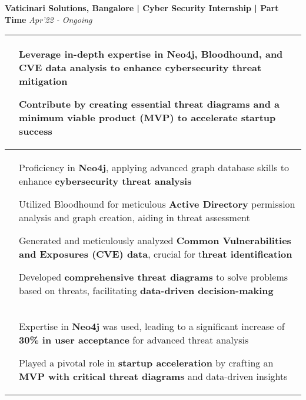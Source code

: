 \documentclass[10pt]{extarticle}
\begin{document}
{\begin{flushleft}
\begin{tcolorbox}[center, width=20.7cm, colback=black!10]
\textbf{Vaticinari Solutions, Bangalore | Cyber Security Internship | Part Time}  \hfill\hfill\textcolor{black!80}{\small \textit{Apr'22 - Ongoing}}
\end{tcolorbox}
\vspace{-10pt}
\begin{center}
\begin{tabularx}{\textwidth}{ p{1.7cm} | X }
\centering\multirow{1}{*}{\textbf{Objective}} & 
\begin{tabitemize}
    \item Leverage in-depth expertise in Neo4j, \textbf{Bloodhound}, and \textbf{CVE data analysis} to enhance cybersecurity threat mitigation
    \item Contribute by creating essential threat diagrams and a minimum viable product (MVP) to accelerate startup success
\end{tabitemize}\\
\hline
\centering\multirow{1}{*}{\textbf{Approach}} & 
\begin{tabitemize}
    \item Proficiency in \textbf{Neo4j}, applying advanced graph database skills to enhance \textbf{cybersecurity threat analysis}  
    \item Utilized Bloodhound for meticulous \textbf{Active Directory} permission analysis and graph creation, aiding in threat assessment
    \item Generated and meticulously analyzed \textbf{Common Vulnerabilities and Exposures (CVE) data}, crucial for t\textbf{hreat identification}
    \item Developed \textbf{comprehensive threat diagrams} to solve problems based on threats, facilitating \textbf{data-driven decision-making}
\end{tabitemize}\\

\hline
\centering\multirow{1}{*}{\textbf{Impact}}& 
\begin{tabitemize}
\item Expertise in \textbf{Neo4j} was used, leading to a significant increase of \textbf{30\% in user acceptance} for advanced threat analysis
    \item Played a pivotal role in \textbf{startup acceleration} by crafting an \textbf{MVP with critical threat diagrams} and data-driven insights
\end{tabitemize}\\
\end{tabularx}
\end{center}


\end{flushleft}}
\end{document}
